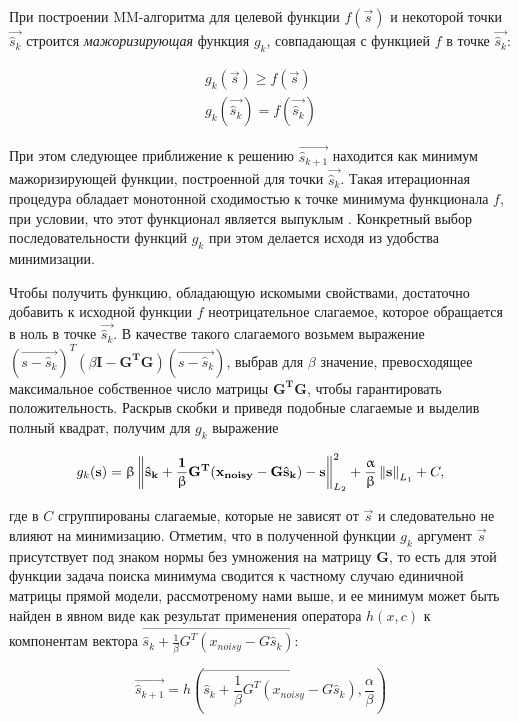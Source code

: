При построении MM-алгоритма для целевой функции $f(\vec{s})$ и некоторой
точки $\vec{\hat{s}_k}$ строится \emph{мажоризирующая} функция $g_k$, совпадающая
с функцией $f$ в точке $\vec{\hat{s}_k}$:

\begin{gather*}
    g_k(\vec{s}) \geq f(\vec{s})\\
    g_k(\vec{\hat{s}_k}) = f(\vec{\hat{s}_k})
\end{gather*}

При этом следующее приближение к решению $\vec{\hat{s}_{k+1}}$ находится как
минимум мажоризирующей функции, построенной для точки $\vec{\hat{s}_k}$. Такая
итерационная процедура обладает монотонной сходимостью к точке минимума
функционала $f$, при условии, что этот функционал является выпуклым
\cite{combettes}.  Конкретный выбор последовательности функций $g_k$ при этом
делается исходя из удобства минимизации.

Чтобы получить функцию, обладающую искомыми свойствами, достаточно добавить к
исходной функции $f$ неотрицательное слагаемое, которое обращается в ноль в
точке $\vec{\hat{s}_k}$.  В качестве такого слагаемого возьмем выражение
$(\vec{s - \hat{s}_k})^T (\beta\mathbf{I - G^TG})(\vec{s - \hat{s}_k})$,
выбрав для $\beta$ значение, превосходящее максимальное собственное число матрицы
$\mathbf{G^TG}$, чтобы гарантировать положительность. Раскрыв скобки и приведя подобные
слагаемые и выделив полный квадрат, получим для $g_k$ выражение

\begin{equation}
    g_k(\mathbf{s}) =
    \upbeta\left\lVert\mathbf{\hat{s}_k + \frac{1}{\upbeta} G^T(x_{noisy} - G \hat{s}_k) - s}\right\rVert^2_{L_2} + \frac{\upalpha}{\upbeta}\left\lVert\mathbf{s}\right\rVert_{L_1} + C,
\end{equation}

где в $C$ сгруппированы слагаемые, которые не зависят от $\vec{s}$ и
следовательно не влияют на минимизацию. Отметим, что в полученной функции
$g_k$ аргумент $\vec{s}$ присутствует под знаком нормы без умножения на
матрицу $\mathbf{G}$, то есть для этой функции задача поиска минимума сводится
к частному случаю единичной матрицы прямой модели, рассмотреному нами выше, и
ее минимум может быть найден в явном виде как результат применения оператора
$h(x, c)$ к компонентам вектора $\vec{\hat{s}_k + \frac{1}{\beta} G^T(x_{noisy} - G \hat{s}_k)}$:

\begin{equation}
    \vec{\hat{s}_{k+1}} = h\left(\vec{\hat{s}_k + \frac{1}{\beta} G^T(x_{noisy} - G \hat{s}_k)}, \frac{\alpha}{\beta}\right)
    \label{eq:fista_next_iter_soft_thresh}
\end{equation}

